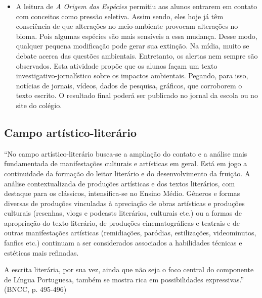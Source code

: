 \documentclass[12pt]{extarticle}
\begin{document}
\begin{itemize} \item A leitura de \emph{A Origem das Espécies} permitiu aos
      alunos entrarem em contato com conceitos como pressão seletiva. Assim
      sendo, eles hoje já têm consciência de que alterações no meio-ambiente
      provocam alterações no bioma. Pois algumas espécies são mais sensíveis
      a essa mudança. Desse modo, qualquer pequena modificação pode gerar sua
      extinção. Na mídia, muito se debate acerca das questões ambientais.
      Entretanto, os alertas nem sempre são observados. Esta atividade propõe
      que os alunos façam um texto investigativo-jornalístico sobre os impactos
      ambientais. Pegando, para isso, notícias de jornais, vídeos, dados de
      pesquisa, gráficos, que corroborem o texto escrito. O resultado final
      poderá ser publicado no jornal da escola ou no site do colégio.
  \end{itemize}

\subsection{Campo artístico-literário }

``No campo artístico-literário busca-se a ampliação do contato e a análise mais
fundamentada de manifestações culturais e artísticas em geral. Está em jogo
a continuidade da formação do leitor literário e do desenvolvimento da fruição.
A análise contextualizada de produções artísticas e dos textos literários, com
destaque para os clássicos, intensifica-se no Ensino Médio. Gêneros e formas
diversas de produções vinculadas à apreciação de obras artísticas e produções
culturais (resenhas, vlogs e podcasts literários, culturais etc.) ou a formas
de apropriação do texto literário, de produções cinematográficas e teatrais
e de outras manifestações artísticas (remidiações, paródias, estilizações,
videominutos, fanfics etc.) continuam a ser considerados associados
a habilidades técnicas e estéticas mais refinadas.

A escrita literária, por sua vez, ainda que não seja o foco central do
componente de Língua Portuguesa, também se mostra rica em possibilidades
expressivas.'' (BNCC, p. 495-496)
\end{document}
